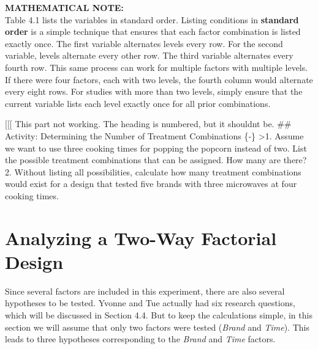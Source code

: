 \documentclass[
]{report}
\begin{document}
\large

\textbf{MATHEMATICAL NOTE:}\\
Table 4.1 lists the variables in standard order. Listing conditions in \textbf{standard order} is a simple technique that ensures that each factor combination is listed exactly once. The first variable alternates levels every row. For the second variable, levels alternate every other row. The third variable alternates every fourth row. This same process can work for multiple factors with multiple levels. If there were four factors, each with two levels, the fourth column would alternate every eight rows. For studies with more than two levels, simply ensure that the current variable lists each level exactly once for all prior combinations.
\normalsize

{[}{[}{[} This part not working. The heading is numbered, but it shouldnt be.
\#\# Activity: Determining the Number of Treatment Combinations \{‑\}
\textgreater1. Assume we want to use three cooking times for popping the popcorn instead of two. List the possible treatment combinations that can be assigned. How many are there?
2. Without listing all possibilities, calculate how many treatment combinations would exist for a design that tested five brands with three microwaves at four cooking times.

\section{\texorpdfstring{\textbf{Analyzing a Two-Way Factorial Design}}{Analyzing a Two-Way Factorial Design}}\label{analyzing-a-two-way-factorial-design}

Since several factors are included in this experiment, there are also several hypotheses to be tested. Yvonne and Tue actually had six research questions, which will be discussed in Section 4.4. But to keep the calculations simple, in this section we will assume that only two factors were tested (\emph{Brand} and \emph{Time}). This leads to three hypotheses corresponding to the \emph{Brand} and \emph{Time} factors.
\end{document}
